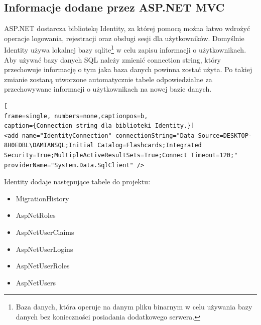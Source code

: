 \subsection{Informacje dodane przez ASP.NET MVC}

ASP.NET dostarcza bibliotekę Identity, za której pomocą można łatwo wdrożyć operacje logowania, rejestracji oraz obsługi sesji dla użytkowników. Domyślnie Identity używa lokalnej bazy sqlite\footnote{Baza danych, która operuje na danym pliku binarnym w celu używania bazy danych bez konieczności posiadania dodatkowego serwera.} w celu zapisu informacji o użytkownikach. Aby używać bazy danych SQL należy zmienić connection string, który przechowuje informację o tym jaka baza danych powinna zostać użyta. Po takiej zmianie zostaną utworzone automatycznie tabele odpowiedzialne za przechowywane informacji o użytkownikach na nowej bazie danych.

\begin{minipage}{\linewidth}
\begin{lstlisting}[
frame=single, numbers=none,captionpos=b, 
caption={Connection string dla biblioteki Identity.}]
<add name="IdentityConnection" connectionString="Data Source=DESKTOP-8H0EDBL\DAMIANSQL;Initial Catalog=Flashcards;Integrated Security=True;MultipleActiveResultSets=True;Connect Timeout=120;" providerName="System.Data.SqlClient" />

\end{lstlisting}
\end{minipage}

Identity dodaje następujące tabele do projektu:
\begin{itemize}
	\item \textunderscore\textunderscore MigrationHistory
	\item AspNetRoles
	\item AspNetUserClaims
	\item AspNetUserLogins
	\item AspNetUserRoles
	\item AspNetUsers
\end{itemize}

